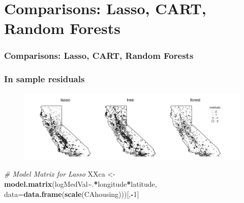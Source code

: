 \documentclass[
  shownotes,
  xcolor={svgnames},
  hyperref={colorlinks,citecolor=DarkBlue,linkcolor=DarkRed,urlcolor=DarkBlue}
  , aspectratio=169]{beamer}
\newenvironment{Shaded}{\begin{snugshade}}{\end{snugshade}}
\newcommand{\CommentTok}[1]{\textcolor[rgb]{0.56,0.35,0.01}{\textit{#1}}}
\newcommand{\DataTypeTok}[1]{\textcolor[rgb]{0.13,0.29,0.53}{#1}}
\newcommand{\DecValTok}[1]{\textcolor[rgb]{0.00,0.00,0.81}{#1}}
\newcommand{\KeywordTok}[1]{\textcolor[rgb]{0.13,0.29,0.53}{\textbf{#1}}}
\newcommand{\NormalTok}[1]{#1}
\newcommand{\OperatorTok}[1]{\textcolor[rgb]{0.81,0.36,0.00}{\textbf{#1}}}
\newcommand{\StringTok}[1]{\textcolor[rgb]{0.31,0.60,0.02}{#1}}
\begin{document}
\section{Comparisons: Lasso, CART, Random Forests}
\begin{frame}[fragile]
\frametitle{Comparisons: Lasso, CART, Random Forests}
\frametitle{In sample residuals}


\begin{figure}[H] \centering
            \captionsetup{justification=centering}
              \includegraphics[scale=0.25]{figures/california}
 \end{figure}

\begin{tiny}
\begin{Shaded}
\begin{Highlighting}[]
\CommentTok{\# Model Matrix for Lasso}
\NormalTok{XXca \textless{}{-}}\StringTok{ }\KeywordTok{model.matrix}\NormalTok{(logMedVal}\OperatorTok{\textasciitilde{}}\NormalTok{.}\OperatorTok{*}\NormalTok{longitude}\OperatorTok{*}\NormalTok{latitude, }
      \DataTypeTok{data=}\KeywordTok{data.frame}\NormalTok{(}\KeywordTok{scale}\NormalTok{(CAhousing)))[,}\OperatorTok{{-}}\DecValTok{1}\NormalTok{]}
\end{Highlighting}
\end{Shaded}
\end{tiny}

\end{frame}
\end{document}
